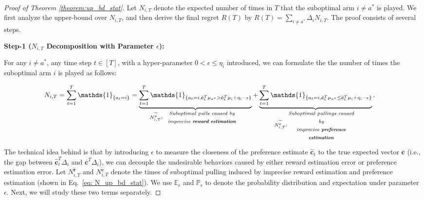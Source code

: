 \begin{proof}[Proof of Theorem \ref{theorem:up_bd_stat}]
Let $N_{i,T}$ denote the expected number of times in $T$ that the suboptimal arm $i \neq a^*$ is played. We first analyze the upper-bound over $N_{i,T}$, and then derive the final regret $R(T)$ by $R(T) = \sum_{i \neq a^*} \Delta_{i} N_{i,T}$.
The proof consists of several steps.

\textbf{Step-1 ($N_{i,T}$ Decomposition with Parameter $\epsilon$):}


For any $i \neq a^*$, any time step $t \in [T]$, with a hyper-parameter $0 < \epsilon \leq \eta_i$ introduced, we can formulate the the number of times the suboptimal arm $i$ is played as follows:

\begin{equation}
\label{eq: N_up_bd_stat}
\begin{aligned}
N_{i,T} &= \sum_{t=1}^{T} \mathds{1}_{\{a_t = i\}} 
= 
\underbrace{\sum_{t=1}^{T} \mathds{1}_{\{a_t = i, \hat{\boldsymbol{c}}_{t}^{T} \mu_{a^{*}} > \hat{\boldsymbol{c}}_{t}^{T} \mu_{i} + \eta_i - \epsilon \}}}
_{N_{i,T}^{\widetilde{\boldsymbol{r}}}: \text { \parbox{110pt}{\centering \emph{Suboptimal pulls caused by imprecise \textbf{reward estimation} }} } }
+ 
\underbrace{\sum_{t=1}^{T} \mathds{1}_{\{a_t = i, \hat{\boldsymbol{c}}_{t}^{T} \mu_{a^{*}} \leq \hat{\boldsymbol{c}}_{t}^{T} \mu_{i} + \eta_i - \epsilon \}}}
_{N_{i,T}^{\widetilde{\boldsymbol{c}}}: \text {\parbox{100pt}{\centering \emph{Suboptimal pullings caused by \\ imprecise \textbf{preference estimation} }} } }.
\end{aligned}
\end{equation}

The technical idea behind is that by introducing $\epsilon$ to measure the closeness of the preference estimate $\hat{\boldsymbol{c}}_t$ to the true expected vector $\overline{\boldsymbol{c}}$ (i.e., the gap between $\hat{\boldsymbol{c}}_t^T \Delta_i$ and $\boldsymbol{\overline{c}}^T \Delta_i$), we can decouple the undesirable behaviors caused by either reward estimation error or preference estimation error.
Let $N_{i,T}^{\widetilde{\boldsymbol{r}}}$ and $N_{i,T}^{\widetilde{\boldsymbol{c}}}$ denote the times of suboptimal pulling induced by imprecise reward estimation and preference estimation (shown in Eq.~\ref{eq: N_up_bd_stat}).
We use $\mathbb{E}_{\epsilon}$ and $\mathbb{P}_{\epsilon}$ to denote the probability distribution and expectation under parameter $\epsilon$. Next, we will study these two terms separately.


\end{proof}
